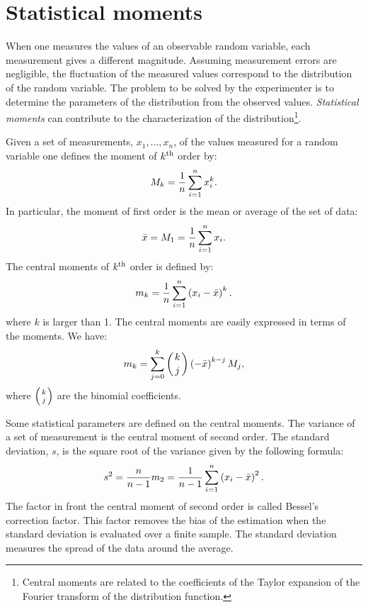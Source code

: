 \documentclass[twoside]{book}
\begin{document}
\section{Statistical moments}
\label{sec:moments} When one measures the values of an observable
random variable, each measurement gives a different magnitude.
Assuming measurement errors are negligible, the fluctuation of the
measured values correspond to the distribution of the random
variable. The problem to be solved by the experimenter is to
determine the parameters of the distribution from the observed
values. {\sl Statistical moments} can contribute to the
characterization of the distribution\footnote{Central moments are
related to the coefficients of the Taylor expansion of the Fourier
transform of the distribution function.}.

Given a set of measurements, $x_1,\ldots,x_n$, of the values
measured for a random variable one defines the moment of $k^{\mathop{\rm th}}$
order by:
\begin{equation}
  M_k={1\over n}\sum_{i=1}^n x_i^k.
\end{equation}
In particular, the moment of first order is the mean or average of
the set of data:
\begin{equation}
\label{eq:average}
  \bar{x}=M_1={1\over n}\sum_{i=1}^n x_i.
\end{equation}
The central moments of $k^{\mathop{\rm th}}$ order is defined by:
\begin{equation}
  m_k={1\over n}\sum_{i=1}^n \left(x_i-\bar{x}\right)^k.
\end{equation}
where $k$ is larger than 1. The central moments are easily
expressed in terms of the moments. We have:
\begin{equation}
  m_k=\sum_{j=0}^k \left({k \atop j}\right)\left(-\bar{x}\right)^{k-j}M_j,
\end{equation}
where $\left({k \atop j}\right)$ are the binomial coefficients.

Some statistical parameters are defined on the central moments.
The variance of a set of measurement is the central moment of
second order. The standard deviation, $s$, is the square root of
the variance given by the following formula:
\begin{equation}
s^2={\displaystyle n \over \displaystyle n-1}m_2 ={\displaystyle 1
\over \displaystyle n-1} \sum_{i=1}^n \left(x_i-\bar{x}\right)^2.
\end{equation}
The factor in front the central moment of second order is called
Bessel's correction factor. This factor removes the bias of the
estimation when the standard deviation is evaluated over a finite
sample. The standard deviation measures the spread of the data
around the average.
\end{document}

